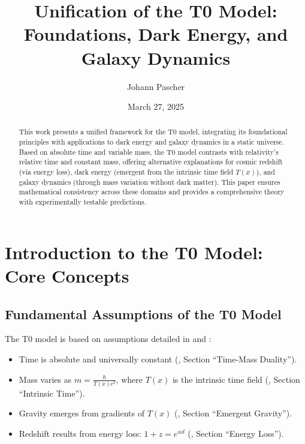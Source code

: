 \documentclass[a4paper,12pt]{article}
\theoremstyle{definition}
\theoremstyle{remark}
\newcommand{\Tfield}{T(x)}
\begin{document}
	
	\title{Unification of the T0 Model: \\ Foundations, Dark Energy, and Galaxy Dynamics}
	\author{Johann Pascher}
	\date{March 27, 2025}
	\maketitle
	
	\begin{abstract}
		This work presents a unified framework for the T0 model, integrating its foundational principles with applications to dark energy and galaxy dynamics in a static universe. Based on absolute time and variable mass, the T0 model contrasts with relativity’s relative time and constant mass, offering alternative explanations for cosmic redshift (via energy loss), dark energy (emergent from the intrinsic time field \(\Tfield\)), and galaxy dynamics (through mass variation without dark matter). This paper ensures mathematical consistency across these domains and provides a comprehensive theory with experimentally testable predictions.
	\end{abstract}
	
	\tableofcontents
	\newpage
	
	\section{Introduction to the T0 Model: Core Concepts}
	
	\subsection{Fundamental Assumptions of the T0 Model}
	
	The T0 model is based on assumptions detailed in \cite{pascher_params_2025} and \cite{pascher_galaxies_2025}:
	
	\begin{tcolorbox}[colback=blue!5!white,colframe=blue!75!black,title=Fundamental Assumptions of the T0 Model]
		\begin{itemize}
			\item Time is absolute and universally constant (\cite{pascher_params_2025}, Section “Time-Mass Duality”).
			\item Mass varies as \(m = \frac{\hbar}{\Tfield c^2}\), where \(\Tfield\) is the intrinsic time field (\cite{pascher_params_2025}, Section “Intrinsic Time”).
			\item Gravity emerges from gradients of \(\Tfield\) (\cite{pascher_galaxies_2025}, Section “Emergent Gravity”).
			\item Redshift results from energy loss: \(1 + z = e^{\alpha d}\) (\cite{pascher_messdifferenzen_2025}, Section “Energy Loss”).
		\end{itemize}
	\end{tcolorbox}
	
\end{document}
